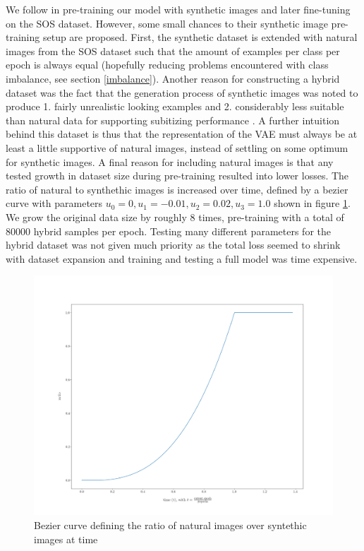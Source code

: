 \documentclass[twocolumn]{article}
\begin{document}
We follow \citet{zhang2016salient} in pre-training our model with
synthetic images and later fine-tuning on the SOS dataset. However, some
small chances to their synthetic image pre-training setup are proposed.
First, the synthetic dataset is extended with natural images from the
SOS dataset such that the amount of examples per class per epoch is
always equal (hopefully reducing problems encountered with class
imbalance, see section \ref{imbalance}). Another
reason for constructing a hybrid dataset was the fact that the
generation process of synthetic images was noted to produce 1. fairly
unrealistic looking examples and 2. considerably less suitable than
natural data for supporting subitizing performance
\citep{zhang2016salient}. A further intuition behind this dataset is
thus that the representation of the VAE must always be at least a little
supportive of natural images, instead of settling on some optimum for
synthetic images. A final reason for including natural images is that
any tested growth in dataset size during pre-training resulted into
lower losses. The ratio of natural to synthethic images is increased
over time, defined by a bezier curve with parameters
\(u_0=0, u_1=-0.01, u_2=0.02, u_3=1.0\) shown in figure \ref{fig:bezier}. We grow the
original data size by roughly 8 times, pre-training with a total of
80000 hybrid samples per epoch. Testing many different parameters for
the hybrid dataset was not given much priority as the total loss seemed
to shrink with dataset expansion and training and testing a full model
was time expensive.


\begin{figure}
\centering
\includegraphics{bezier.png}
\caption{Bezier curve defining the ratio of natural images over syntethic images at time }
\label{fig:bezier}
\end{figure}
\end{document}
